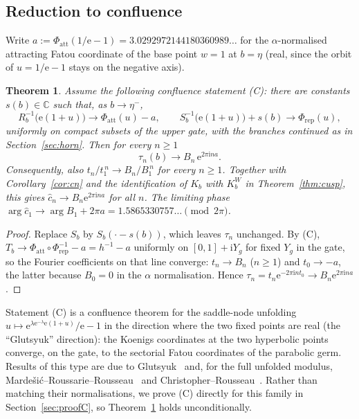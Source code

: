 \documentclass[11pt]{amsart}
\newtheorem{theorem}{Theorem}[section]
\theoremstyle{definition}
\newcommand{\Rr}{R}
\newcommand{\Kk}{K}
\newcommand{\eee}{\mathrm{e}}
\newcommand{\ii}{\mathrm{i}}
\begin{document}
\subsection{Reduction to confluence}

Write $a:=\Phi_{\mathrm{att}}(1/\eee-1)=3.0292972144180360989\ldots$ for the
$\alpha$-normalised attracting Fatou coordinate of the base point $w=1$ at
$b=\eta$ (real, since the orbit of $u=1/\eee-1$ stays on the negative axis).

\begin{theorem}\label{thm:reduction}
Assume the following confluence statement \textup{(C)}: there are constants
$s(b)\in\mathbb C$ such that, as $b\to\eta^-$,
\[
 \Rr_b^{-1}\bigl(\eee(1+u)\bigr)\to\Phi_{\mathrm{att}}(u)-a,\qquad
 S_b^{-1}\bigl(\eee(1+u)\bigr)+s(b)\to\Phi_{\mathrm{rep}}(u),
\]
uniformly on compact subsets of the upper gate, with the branches continued as
in Section~\ref{sec:horn}.  Then for every $n\ge1$
\[
 \tau_n(b)\longrightarrow B_n\,\eee^{2\pi\ii na}.
\]
Consequently, also
$t_n/t_1^{\,n}\to B_n/B_1^{\,n}$ for every $n\ge1$.
Together with Corollary~\ref{cor:cn} and the identification of
$\Kk_b$ with $\Kk^W_b$ in Theorem~\ref{thm:cusp}, this gives
$\hat c_n\to B_n\eee^{2\pi\ii na}$ for all $n$.  The limiting phase
$\arg\hat c_1\to\arg B_1+2\pi a=1.5865330757\ldots\pmod{2\pi}$.
\end{theorem}

\begin{proof}
Replace $S_b$ by $S_b(\cdot-s(b))$, which leaves $\tau_n$ unchanged.  By (C),
$T_b\to\Phi_{\mathrm{att}}\circ\Phi_{\mathrm{rep}}^{-1}-a=h^{-1}-a$ uniformly
on $[0,1]+\ii Y_g$ for fixed $Y_g$ in the gate, so the Fourier coefficients on
that line converge: $t_n\to B_n$ ($n\ge1$) and $t_0\to-a$, the latter because
$B_0=0$ in the $\alpha$ normalisation.  Hence
$\tau_n=t_n\eee^{-2\pi\ii nt_0}\to B_n\eee^{2\pi\ii na}$.
\end{proof}

Statement (C) is a confluence theorem for the saddle-node unfolding
$u\mapsto \eee^{\lambda\eee^{-\lambda}\eee(1+u)}/\eee-1$ in the direction where the
two fixed points are real (the ``Glutsyuk'' direction): the Koenigs
coordinates at the two hyperbolic points converge, on the gate, to the
sectorial Fatou coordinates of the parabolic germ.  Results of this type are
due to Glutsyuk~\cite{Glutsyuk2001} and, for the full unfolded modulus,
Marde\v{s}i\'c--Roussarie--Rousseau~\cite{MRR2004} and
Christopher--Rousseau~\cite{ChristopherRousseau}.  Rather than matching their
normalisations, we prove (C) directly for this family in
Section~\ref{sec:proofC}, so Theorem~\ref{thm:reduction} holds unconditionally.
\end{document}
